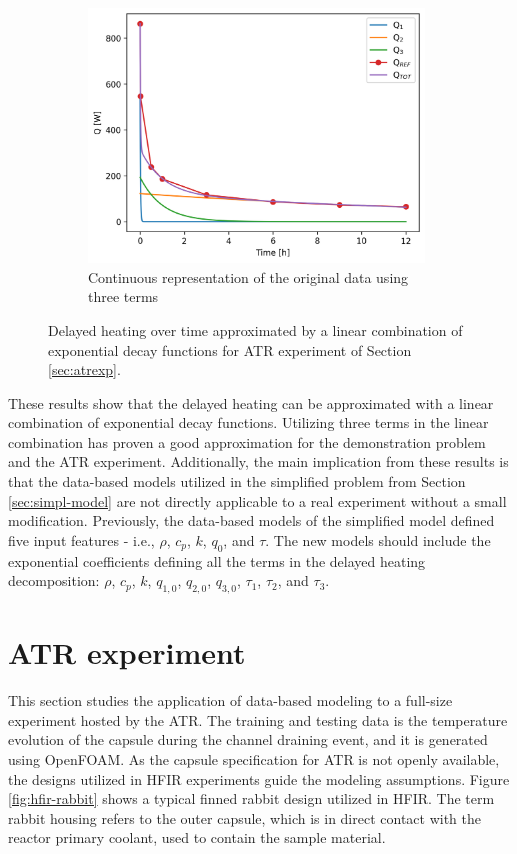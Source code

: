 \begin{figure}[htbp!]
\begin{subfigure}[b]{0.48\textwidth}
    \centering
    \includegraphics[width=0.98\textwidth]{figures/atr-13-deco-2}
    \caption{Continuous representation of the original data using three terms}
    \label{fig:modes-atr-c}
  \end{subfigure}
  \caption{Delayed heating over time approximated by a linear combination of exponential decay functions for ATR experiment of Section \ref{sec:atrexp}.}
  \label{fig:modes-atr}
\end{figure}

These results show that the delayed heating can be approximated with a linear combination of exponential decay functions.
Utilizing three terms in the linear combination has proven a good approximation for the demonstration problem and the ATR experiment.
Additionally, the main implication from these results is that the data-based models utilized in the simplified problem from Section \ref{sec:simpl-model} are not directly applicable to a real experiment without a small modification.
Previously, the data-based models of the simplified model defined five input features - i.e., $\rho$, $c_p$, $k$, $q_0$, and $\tau$.
The new models should include the exponential coefficients defining all the terms in the delayed heating decomposition: $\rho$, $c_p$, $k$, $q_{1,0}$, $q_{2,0}$, $q_{3,0}$, $\tau_1$, $\tau_2$, and $\tau_3$.


\section{ATR experiment}
\label{sec:atr}

This section studies the application of data-based modeling to a full-size experiment hosted by the ATR.
The training and testing data is the temperature evolution of the capsule during the channel draining event, and it is generated using OpenFOAM.
As the capsule specification for ATR is not openly available, the designs utilized in \gls*{HFIR} experiments guide the modeling assumptions.
Figure \ref{fig:hfir-rabbit} shows a typical finned rabbit design utilized in HFIR.
The term rabbit housing refers to the outer capsule, which is in direct contact with the reactor primary coolant, used to contain the sample material.

